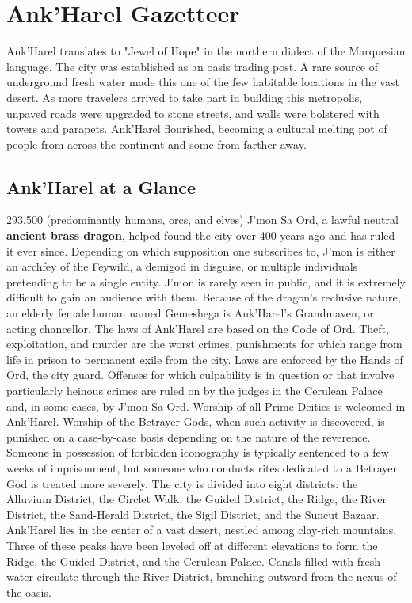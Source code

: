 \documentclass[10pt,a4,twoside,twocolumn,openany,nodeprecatedcode]{dndbook}
\begin{document}
\section{Ank'Harel Gazetteer}
Ank'Harel translates to "Jewel of Hope" in the northern dialect of the Marquesian language. The city was established as an oasis trading post. A rare source of underground fresh water made this one of the few habitable locations in the vast desert.
As more travelers arrived to take part in building this metropolis, unpaved roads were upgraded to stone streets, and walls were bolstered with towers and parapets. Ank'Harel flourished, becoming a cultural melting pot of people from across the continent and some from farther away.
\subsection{Ank'Harel at a Glance}
{{293,500 (predominantly humans, orcs, and elves)}}
{{J'mon Sa Ord, a lawful neutral \textbf{ancient brass dragon}, helped found the city over 400 years ago and has ruled it ever since. Depending on which supposition one subscribes to, J'mon is either an archfey of the Feywild, a demigod in disguise, or multiple individuals pretending to be a single entity. J'mon is rarely seen in public, and it is extremely difficult to gain an audience with them. Because of the dragon's reclusive nature, an elderly female human named Gemeshega is Ank'Harel's Grandmaven, or acting chancellor.}}
{{The laws of Ank'Harel are based on the Code of Ord. Theft, exploitation, and murder are the worst crimes, punishments for which range from life in prison to permanent exile from the city. Laws are enforced by the Hands of Ord, the city guard. Offenses for which culpability is in question or that involve particularly heinous crimes are ruled on by the judges in the Cerulean Palace and, in some cases, by J'mon Sa Ord.}}
{{Worship of all Prime Deities is welcomed in Ank'Harel. Worship of the Betrayer Gods, when such activity is discovered, is punished on a case-by-case basis depending on the nature of the reverence. Someone in possession of forbidden iconography is typically sentenced to a few weeks of imprisonment, but someone who conducts rites dedicated to a Betrayer God is treated more severely.}}
{{The city is divided into eight districts: the Alluvium District, the Circlet Walk, the Guided District, the Ridge, the River District, the Sand-Herald District, the Sigil District, and the Suncut Bazaar.}}
{{Ank'Harel lies in the center of a vast desert, nestled among clay-rich mountains. Three of these peaks have been leveled off at different elevations to form the Ridge, the Guided District, and the Cerulean Palace. Canals filled with fresh water circulate through the River District, branching outward from the nexus of the oasis.}}
\end{document}
